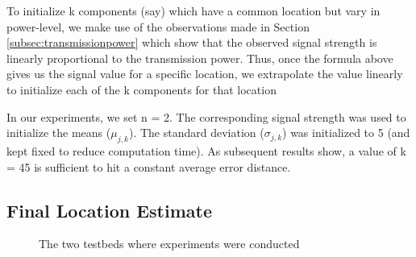 \documentclass{Localization-PaperWriteupDraft}
\begin{document}
To initialize k components (say) which have a common location but vary in
power-level, we make use of the observations made in Section
\ref{subsec:transmissionpower} which show that the observed signal strength is linearly proportional to the transmission power. 
Thus, once the formula above gives us the signal value for
a specific location, we extrapolate the value linearly to initialize
each of the k components for that location 

In our experiments, we set n = 2. The corresponding signal strength was
used to initialize the means ($\mu_{j, k}$). The standard deviation
($\sigma_{j, k}$) was initialized to
5 (and kept fixed to reduce computation time). As subsequent results
show, a value of k = 45 is sufficient to hit a constant average error
distance.

\subsection{Final Location Estimate}
\label{subsec:finallocationestimate}

\begin{figure}
	\centering
		 \quad \quad
	\caption{The two testbeds where experiments were conducted}
	\label{fig:experimenttestbed}
\end{figure}
\end{document}
